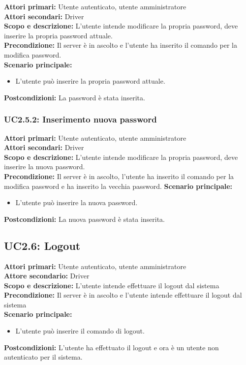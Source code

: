 \documentclass{scalatekids-article}
\begin{document}
\textbf{Attori primari:} Utente autenticato, utente amministratore\\
\textbf{Attori secondari:} Driver\\
\textbf{Scopo e descrizione:} L'utente intende modificare la propria password, deve inserire la propria password attuale.\\
\textbf{Precondizione:} Il server è in ascolto e l'utente ha inserito il comando per la modifica password.\\
\textbf{Scenario principale:}
\begin{itemize}
\item L'utente può inserire la propria password attuale.
\end{itemize}
\textbf{Postcondizioni:} La password è stata inserita.

\subsubsection{UC2.5.2: Inserimento nuova password}

\textbf{Attori primari:} Utente autenticato, utente amministratore\\
\textbf{Attori secondari:} Driver\\
\textbf{Scopo e descrizione:} L'utente intende modificare la propria password, deve inserire la nuova password.\\
\textbf{Precondizione:} Il server è in ascolto, l'utente ha inserito il comando per la modifica password e ha inserito la vecchia password.
\textbf{Scenario principale:}
\begin{itemize}
\item L'utente può inserire la nuova password.
\end{itemize}
\textbf{Postcondizioni:} La nuova password è stata inserita.

\subsection{UC2.6: Logout}

\textbf{Attori primari:} Utente autenticato, utente amministratore\\
\textbf{Attore secondario:} Driver\\
\textbf{Scopo e descrizione:} L'utente intende effettuare il logout dal sistema\\
\textbf{Precondizione:} Il server è in ascolto e l'utente intende effettuare il logout dal sistema\\
\textbf{Scenario principale:}
\begin{itemize}
\item L'utente può inserire il comando di logout.
\end{itemize}
\textbf{Postcondizioni:} L'utente ha effettuato il logout e ora è un utente non autenticato per il sistema.
\end{document}
